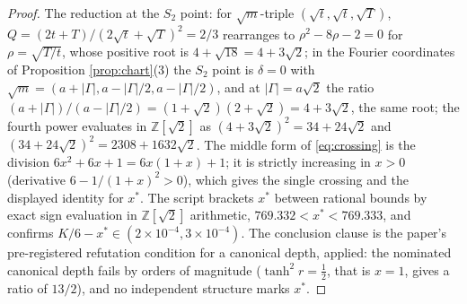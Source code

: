\documentclass[11pt]{article}
\theoremstyle{definition}
\begin{document}
\begin{proof}
The reduction at the $S_{2}$ point: for $\sqrt{m}$-triple $(\sqrt{t}, \sqrt{t}, \sqrt{T})$, $Q = (2t + T)/(2\sqrt{t} + \sqrt{T})^{2} = 2/3$ rearranges to $\rho^{2} - 8\rho - 2 = 0$ for $\rho = \sqrt{T/t}$, whose positive root is $4 + \sqrt{18} = 4 + 3\sqrt{2}$; in the Fourier coordinates of Proposition \ref{prop:chart}(3) the $S_{2}$ point is $\delta = 0$ with $\sqrt{m} = (a + |\Gamma|, a - |\Gamma|/2, a - |\Gamma|/2)$, and at $|\Gamma| = a\sqrt{2}$ the ratio $(a + |\Gamma|)/(a - |\Gamma|/2) = (1 + \sqrt{2})(2 + \sqrt{2}) = 4 + 3\sqrt{2}$, the same root; the fourth power evaluates in $\mathbb{Z}[\sqrt{2}]$ as $(4+3\sqrt{2})^{2} = 34 + 24\sqrt{2}$ and $(34+24\sqrt{2})^{2} = 2308 + 1632\sqrt{2}$. The middle form of \eqref{eq:crossing} is the division $6x^{2} + 6x + 1 = 6x(1+x) + 1$; it is strictly increasing in $x > 0$ (derivative $6 - 1/(1+x)^{2} > 0$), which gives the single crossing and the displayed identity for $x^{*}$. The script brackets $x^{*}$ between rational bounds by exact sign evaluation in $\mathbb{Z}[\sqrt{2}]$ arithmetic, $769.332 < x^{*} < 769.333$, and confirms $K/6 - x^{*} \in (2 \times 10^{-4}, 3 \times 10^{-4})$. The conclusion clause is the paper's pre-registered refutation condition for a canonical depth, applied: the nominated canonical depth fails by orders of magnitude ($\tanh^{2}r = \tfrac12$, that is $x = 1$, gives a ratio of $13/2$), and no independent structure marks $x^{*}$.
\end{proof}
\end{document}
